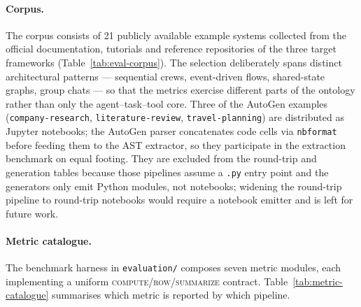 \paragraph{Corpus.} The corpus consists of 21 publicly available
example systems collected from the official documentation, tutorials
and reference repositories of the three target frameworks
(Table~\ref{tab:eval-corpus}). The selection deliberately spans
distinct architectural patterns — sequential crews, event-driven flows,
shared-state graphs, group chats — so that the metrics exercise
different parts of the ontology rather than only the agent--task--tool
core. Three of the AutoGen examples (\texttt{company-research},
\texttt{literature-review}, \texttt{travel-planning}) are distributed
as Jupyter notebooks; the AutoGen parser concatenates code cells via
\texttt{nbformat} before feeding them to the AST extractor, so they
participate in the extraction benchmark on equal footing. They are
excluded from the round-trip and generation tables because those
pipelines assume a \texttt{.py} entry point and the generators only
emit Python modules, not notebooks; widening the round-trip pipeline
to round-trip notebooks would require a notebook emitter and is left
for future work.

\begin{table}[ht]
  \centering
  \small
  \caption{Example corpus used in the transformation experiments.
           The three notebook-only AutoGen examples participate in
           extraction but not in round-trip / generation.}
  \label{tab:eval-corpus}
\end{table}

\paragraph{Metric catalogue.}
The benchmark harness in \texttt{evaluation/} composes seven metric
modules, each implementing a uniform
\textsc{compute}/\textsc{row}/\textsc{summarize} contract.
Table~\ref{tab:metric-catalogue} summarises which metric is reported by
which pipeline.

